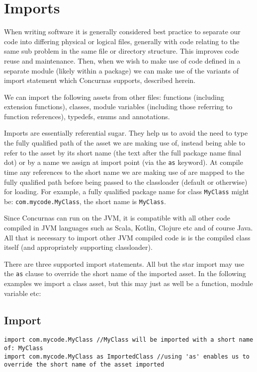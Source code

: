 \documentclass[conc-doc]{subfiles}
\begin{document}
	\chapter[Imports]{Imports}

When writing software it is generally considered best practice to separate our code into differing physical or logical files, generally with code relating to the same sub problem in the same file or directory structure. This improves code reuse and maintenance. Then, when we wish to make use of code defined in a separate module (likely within a package) we can make use of the variants of import statement which Concurnas supports, described herein.

We can import the following assets from other files: functions (including extension functions), classes, module variables (including those referring to function references), typedefs, enums and annotations.

Imports are essentially referential sugar. They help us to avoid the need to type the fully qualified path of the asset we are making use of, instead being able to refer to the asset by its short name (the text after the full package name final dot) or by a name we assign at import point (via the \lstinline{as} keyword). At compile time any references to the short name we are making use of are mapped to the fully qualified path before being passed to the classloader (default or otherwise) for loading. For example, a fully qualified package name for class \lstinline{MyClass} might be: \lstinline{com.mycode.MyClass}, the short name is \lstinline{MyClass}.

Since Concurnas can run on the JVM, it is compatible with all other code compiled in JVM languages such as Scala, Kotlin, Clojure etc and of course Java. All that is necessary to import other JVM compiled code is is the compiled class itself (and appropriately supporting classloader).

There are three supported import statements. All but the star import may use the \lstinline{as} clause to override the short name of the imported asset. In the following examples we import a class asset, but this may just as well be a function, module variable etc:

\section{Import}
\begin{lstlisting}
import com.mycode.MyClass //MyClass will be imported with a short name of: MyClass
import com.mycode.MyClass as ImportedClass //using 'as' enables us to override the short name of the asset imported
\end{lstlisting}
\end{document}
